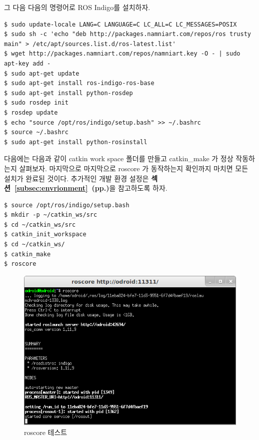 \newpage

그 다음 다음의 명령어로 ROS Indigo를 설치하자.

\vspace{\baselineskip}
\begin{lstlisting}[language=ROS]
$ sudo update-locale LANG=C LANGUAGE=C LC_ALL=C LC_MESSAGES=POSIX
$ sudo sh -c 'echo "deb http://packages.namniart.com/repos/ros trusty main" > /etc/apt/sources.list.d/ros-latest.list'
$ wget http://packages.namniart.com/repos/namniart.key -O - | sudo apt-key add -
$ sudo apt-get update
$ sudo apt-get install ros-indigo-ros-base
$ sudo apt-get install python-rosdep
$ sudo rosdep init
$ rosdep update
$ echo "source /opt/ros/indigo/setup.bash" >> ~/.bashrc
$ source ~/.bashrc
$ sudo apt-get install python-rosinstall
\end{lstlisting}

다음에는 다음과 같이 catkin work space 폴더를 만들고 catkin\_make 가 정상 작동하는지 살펴보자. 마지막으로 마지막으로 roscore 가 동작하는지 확인까지 마치면 모든 설치가 완료된 것이다. 추가적인 개발 환경 설정은 \textbf{섹션~\ref{subsec:envrionment}~(pp.\pageref{subsec:envrionment})}을 참고하도록 하자.

\vspace{\baselineskip}
\begin{lstlisting}[language=ROS]
$ source /opt/ros/indigo/setup.bash
$ mkdir -p ~/catkin_ws/src
$ cd ~/catkin_ws/src
$ catkin_init_workspace
$ cd ~/catkin_ws/
$ catkin_make
$ roscore
\end{lstlisting}

\begin{figure}[h]
\centering
\includegraphics[width=0.7\columnwidth]{pictures/chapter3/odroid_roscore.png}
\caption{roscore 테스트}
\end{figure}

